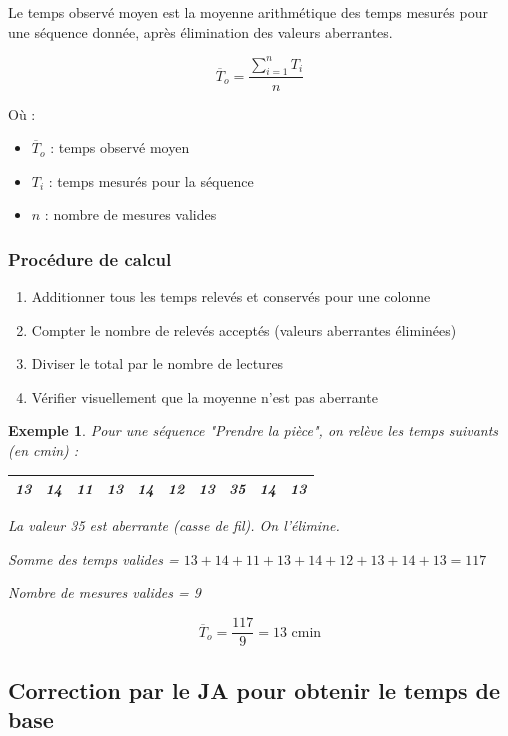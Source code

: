 \documentclass[a4paper,12pt]{article}
\newtheorem{exemple}{Exemple}[section]
\begin{document}
Le temps observé moyen est la moyenne arithmétique des temps mesurés pour une séquence donnée, après élimination des valeurs aberrantes.

\[
\overline{T}_o = \frac{\sum_{i=1}^{n} T_i}{n}
\]

Où :
\begin{itemize}
    \item $\overline{T}_o$ : temps observé moyen
    \item $T_i$ : temps mesurés pour la séquence
    \item $n$ : nombre de mesures valides
\end{itemize}

\subsubsection{Procédure de calcul}

\begin{enumerate}
    \item Additionner tous les temps relevés et conservés pour une colonne
    \item Compter le nombre de relevés acceptés (valeurs aberrantes éliminées)
    \item Diviser le total par le nombre de lectures
    \item Vérifier visuellement que la moyenne n'est pas aberrante
\end{enumerate}

\begin{exemple}
Pour une séquence "Prendre la pièce", on relève les temps suivants (en cmin) :

\begin{center}
\begin{tabular}{|c|c|c|c|c|c|c|c|c|c|}
\hline
13 & 14 & 11 & 13 & 14 & 12 & 13 & 35 & 14 & 13 \\
\hline
\end{tabular}
\end{center}

La valeur 35 est aberrante (casse de fil). On l'élimine.

Somme des temps valides = $13 + 14 + 11 + 13 + 14 + 12 + 13 + 14 + 13 = 117$

Nombre de mesures valides = 9

\[
\overline{T}_o = \frac{117}{9} = 13 \text{ cmin}
\]
\end{exemple}

\subsection{Correction par le JA pour obtenir le temps de base}
\end{document}
